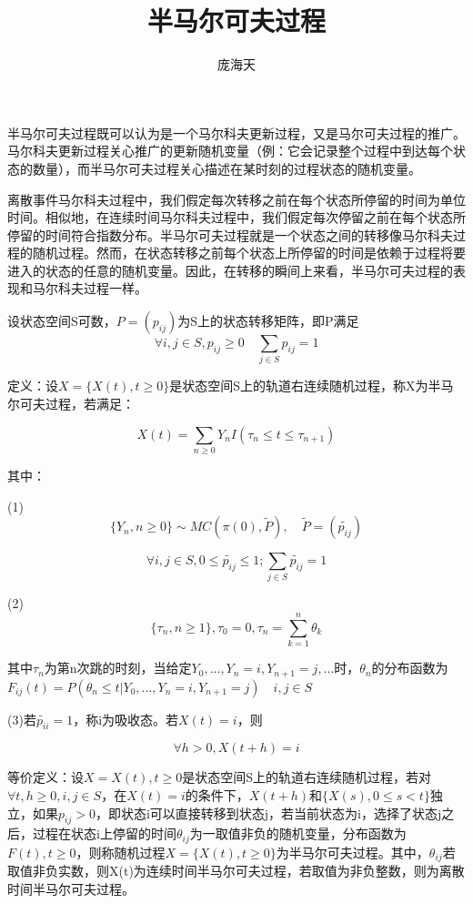 \documentclass[UTF8]{ctexart}
\begin{document}
\title{半马尔可夫过程}
\author{庞海天}
\maketitle

半马尔可夫过程既可以认为是一个马尔科夫更新过程，又是马尔可夫过程的推广。马尔科夫更新过程关心推广的更新随机变量（例：它会记录整个过程中到达每个状态的数量），而半马尔可夫过程关心描述在某时刻的过程状态的随机变量。

离散事件马尔科夫过程中，我们假定每次转移之前在每个状态所停留的时间为单位时间。相似地，在连续时间马尔科夫过程中，我们假定每次停留之前在每个状态所停留的时间符合指数分布。半马尔可夫过程就是一个状态之间的转移像马尔科夫过程的随机过程。然而，在状态转移之前每个状态上所停留的时间是依赖于过程将要进入的状态的任意的随机变量。因此，在转移的瞬间上来看，半马尔可夫过程的表现和马尔科夫过程一样。

设状态空间S可数，$P=(p_{ij})$为S上的状态转移矩阵，即P满足$$\forall i,j \in S,p_{ij}\ge 0\quad \sum_{j\in S}p_{ij}=1$$

定义：设$X=\{X(t),t\ge 0\}$是状态空间S上的轨道右连续随机过程，称X为半马尔可夫过程，若满足：

$$X(t)=\sum_{n\ge 0}Y_nI(\tau_{n}\le t \le\tau_{n+1})$$

其中：

(1)$$\{Y_n,n\ge0\} \sim MC(\pi(0),\widetilde{P}),\quad \widetilde{P}=(\widetilde{p_{ij}}) $$

$$\forall i,j \in S, 0\le \widetilde{p_{ij}}\le 1;\sum_{j\in S}\widetilde{p_{ij}}=1$$

(2)$$\{\tau_n,n\ge1 \},\tau_0=0,\tau_n=\sum_{k=1}^n\theta_k$$

其中$\tau_n$为第n次跳的时刻，当给定$Y_0,...,Y_n=i,Y_{n+1}=j,...$时，$\theta_n$的分布函数为$F_{ij}(t)=P(\theta_n\le t|Y_0,...,Y_n=i,Y_{n+1}=j)\quad i,j\in S$

(3)若$\widetilde{p_{ii}}=1$，称i为吸收态。若$X(t)=i$，则

$$\forall h>0,X(t+h)=i$$

等价定义：设$X={X(t),t\ge 0}$是状态空间S上的轨道右连续随机过程，若对$\forall t,h\ge 0,i,j\in S$，在$X(t)=i $的条件下，$X(t+h)$和$\{X(s),0\le s < t\}$独立，如果$p_{ij}>0$，即状态i可以直接转移到状态j，若当前状态为i，选择了状态j之后，过程在状态i上停留的时间$\theta_{ij}$为一取值非负的随机变量，分布函数为$F(t),t \ge 0$，则称随机过程$X=\{X(t),t\ge 0\}$为半马尔可夫过程。其中，$\theta_{ij}$若取值非负实数，则X(t)为连续时间半马尔可夫过程，若取值为非负整数，则为离散时间半马尔可夫过程。
\end{document}
